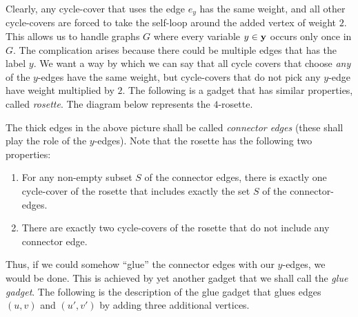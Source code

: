 Clearly, any cycle-cover that uses the edge $e_y$ has the same weight, and all other cycle-covers are forced to take the self-loop around the added vertex of weight $2$. 
This allows us to handle graphs $G$ where every variable $y \in \mathbf{y}$ occurs only once in $G$. 
The complication arises because there could be multiple edges that has the label $y$. 
We want a way by which we can say that all cycle covers that choose \emph{any} of the $y$-edges have the same weight, but cycle-covers that do not pick any $y$-edge have weight multiplied by $2$. 
The following is a gadget that has similar properties, called \emph{rosette}. 
The diagram below represents the $4$-rosette. 
\begin{center}
\end{center}
The thick edges in the above picture shall be called \emph{connector edges} (these shall play the role of the $y$-edges). 
Note that the rosette has the following two properties:
\begin{enumerate}
\item For any non-empty subset $S$ of the connector edges, there is exactly one cycle-cover of the rosette that includes exactly the set $S$ of the connector-edges. 
\item There are exactly two cycle-covers of the rosette that do not include any connector edge. 
\end{enumerate}
Thus, if we could somehow ``glue'' the connector edges with our $y$-edges, we would be done. 
This is achieved by yet another gadget that we shall call the \emph{glue gadget}. 
The following is the description of the glue gadget that glues edges $(u,v)$ and $(u',v')$ by adding three additional vertices. 

